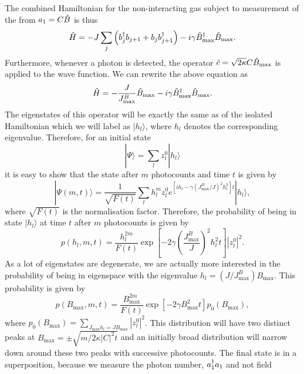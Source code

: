 The combined Hamiltonian for the non-interacting gas subject to
measurement of the from $a_1 = C \hat{B}$ is thus
\begin{equation}
  \hat{H} = -J \sum_j \left( b^\dagger_j b_{j+1} + b_j b^\dagger_{j+1} \right) - i
  \gamma \hat{B}_\mathrm{max}^\dagger \hat{B}_\mathrm{max}.
\end{equation} 
Furthermore, whenever a photon is detected, the operator
$\hat{c} = \sqrt{2 \kappa} C \hat{B}_\mathrm{max}$ is applied to the wave function. We can
rewrite the above equation as
\begin{equation}
  \hat{H} = -\frac{J}{J^B_\mathrm{max}} \hat{B}_\mathrm{max} - i \gamma \hat{B}_\mathrm{max}^\dagger \hat{B}_\mathrm{max}.
\end{equation}
The eigenstates of this operator will be exactly the same as of the
isolated Hamiltonian which we will label as $| h_l \rangle$, where
$h_l$ denotes the corresponding eigenvalue. Therefore, for an initial
state
\begin{equation}
  | \Psi \rangle = \sum_l z_l^0 | h_l \rangle
\end{equation}
it is easy to show that the state after $m$ photocounts and time $t$
is given by
\begin{equation}
  | \Psi (m,t) \rangle = \frac{1}{\sqrt{F(t)}} \sum_l h_l^m z_l^0 e^{[i h_l -
    \gamma(J^B_\mathrm{max}/J)^2 h_l^2]t} | h_l \rangle,
\end{equation}
where $\sqrt{F(t)}$ is the normalisation factor. Therefore, the probability
of being in state $| h_l \rangle$ at time $t$ after $m$ photocounts is
given by
\begin{equation}
  p(h_l, m, t) = \frac{h_l^{2m}} {F(t)} \exp\left[ - 2 \gamma \left(
    \frac{J^B_\mathrm{max}} {J} \right)^2 h_l^2 t \right] |z_l^0|^2.
\end{equation}
As a lot of eigenstates are degenerate, we are actually more
interested in the probability of being in eigenspace with the
eigenvalue $h_l = (J/J^B_\mathrm{max})B_\mathrm{max}$. This probability
is given by
\begin{equation}
  \label{eq:bmax}
  p(B_\mathrm{max}, m, t) = \frac{B_\mathrm{max}^{2m}} {F(t)} \exp\left[ - 2
    \gamma B_\mathrm{max}^2 t \right] p_0 (B_\mathrm{max}),
\end{equation}
where $p_0(B_\mathrm{max}) = \sum_{J_\mathrm{max} h_l = J
  B_\mathrm{max}} |z_l^0|^2$. This distribution will have two distinct
peaks at $B_\mathrm{max} = \pm \sqrt{m/2\kappa |C|^2 t}$ and an
initially broad distribution will narrow down around these two peaks
with successive photocounts. The final state is in a superposition,
because we measure the photon number, $a^\dagger_1 a_1$ and not field
